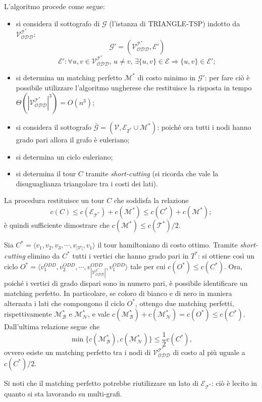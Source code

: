 L'algoritmo procede come segue:
\begin{itemize}
\item si considera il sottografo di $\mathcal{G}$ (l'istanza di TRIANGLE-TSP) indotto da $\mathcal{V_{ODD}^{T^*}}$:
\[
\mathcal{G'} = (\mathcal{V_{ODD}^{T^*}}, \mathcal{E'})
\]
\[
\mathcal{E'}: \forall u,v \in \mathcal{V_{ODD}^{T^*}},\, u \neq v,\, \exists \{u,v\}\in\mathcal{E} \Rightarrow \{u,v\}\in\mathcal{E'};
\]
\item si determina un matching perfetto $\mathcal{M^*}$ di costo minimo in $\mathcal{G'}$: per fare ciò è possibile utilizzare l'algoritmo ungherese che restituisce la risposta in tempo $\Theta(|\mathcal{V_{ODD}^{T^*}}|^3)=O(n^3)$;
\item si considera il sottografo $\bar{\mathcal{G}}=(\mathcal{V},\mathcal{E}_{T^*} \cup \mathcal{M^*})$: poiché ora tutti i nodi hanno grado pari allora il grafo è euleriano;
\item si determina un ciclo euleriano;
\item si determina il tour $C$ tramite \textit{short-cutting} (si ricorda che vale la disuguaglianza triangolare tra i costi dei lati).
\end{itemize}

La procedura restituisce un tour $C$ che soddisfa la relazione
\[
c(C) \leq c(\mathcal{E_{T^*}}) + c(\mathcal{M^*}) \leq c(C^*) + c(\mathcal{M^*});
\]
è quindi sufficiente dimostrare che $c(\mathcal{M^*}) \leq c(\mathcal{T^*})/2$.

Sia $C^*=\langle v_1, v_2, v_3, \cdots, v_{|\mathcal{V}|}, v_1 \rangle$ il tour hamiltoniano di costo ottimo. Tramite \textit{short-cutting} elimino da $C^*$ tutti i vertici che hanno grado pari in $T^*$: si ottiene così un ciclo $O^*=\langle v_1^{ODD}, v_2^{ODD}, \cdots, v_{|\mathcal{V_{ODD}^{T^*}}|}^{ODD}, v_1^{ODD} \rangle$ tale per cui $c(O^*) \leq c(C^*)$. Ora, poiché i vertici di grado dispari sono in numero pari, è possibile identificare un matching perfetto. In particolare, se coloro di bianco e di nero in maniera alternata i lati che compongono il ciclo $O^*$, ottengo due matching perfetti, rispettivamente $\mathcal{M^*_B}$ e $\mathcal{M^*_N}$, e vale $c(\mathcal{M^*_B}) + c(\mathcal{M^*_N}) = c(O^*) \leq c(C^*)$. Dall'ultima relazione segue che
\[
\min\{c(\mathcal{M^*_B}), c(\mathcal{M^*_N})\} \leq \frac{1}{2}c(C^*),
\]
ovvero esiste un matching perfetto tra i nodi di $\mathcal{V_{ODD}^{T^*}}$ di costo al più uguale a $c(C^*)/2$.

Si noti che il matching perfetto potrebbe riutilizzare un lato di $\mathcal{E_{T^*}}$: ciò è lecito in quanto si sta lavorando su multi-grafi.

